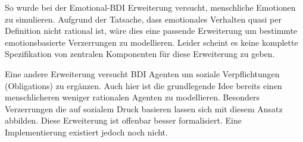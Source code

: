 So wurde bei der Emotional-BDI\cite{pereira2005towards} %
Erweiterung versucht, menschliche Emotionen zu simulieren.
Aufgrund der Tatsache, dass emotionales Verhalten quasi per Definition nicht rational ist, wäre dies eine passende Erweiterung um bestimmte emotionsbasierte Verzerrungen zu modellieren.
Leider scheint es keine komplette Spezifikation von zentralen Komponenten für diese Erweiterung zu geben\cite[paragraph 4.16]{balke2014agents}.

Eine andere Erweiterung versucht BDI Agenten um soziale Verpflichtungen (Obligations) zu ergänzen.
Auch hier ist die grundlegende Idee bereits einen menschlicheren weniger rationalen Agenten zu modellieren.
Besonders Verzerrungen die auf sozialem Druck basieren lassen sich mit diesem Ansatz abbilden.
Diese Erweiterung ist offenbar besser formalisiert.
Eine Implementierung existiert jedoch noch nicht\cite[stand 2015]{balke2014agents}.
